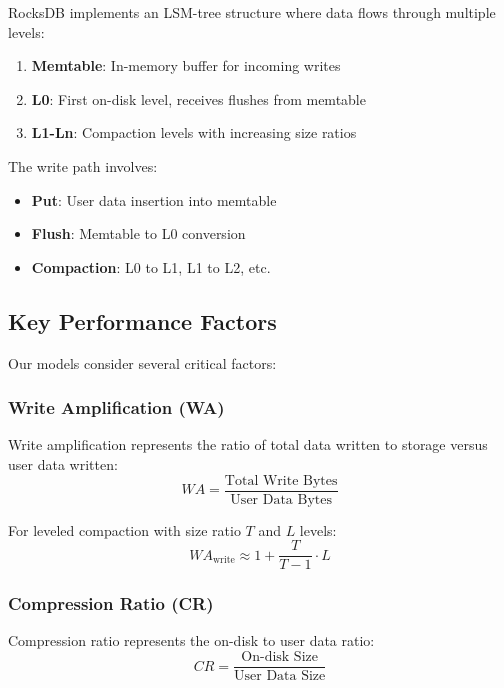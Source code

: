 \documentclass[11pt,twocolumn]{article}
\begin{document}
RocksDB implements an LSM-tree structure where data flows through multiple levels:
\begin{enumerate}
    \item \textbf{Memtable}: In-memory buffer for incoming writes
    \item \textbf{L0}: First on-disk level, receives flushes from memtable
    \item \textbf{L1-Ln}: Compaction levels with increasing size ratios
\end{enumerate}

The write path involves:
\begin{itemize}
    \item \textbf{Put}: User data insertion into memtable
    \item \textbf{Flush}: Memtable to L0 conversion
    \item \textbf{Compaction}: L0 to L1, L1 to L2, etc.
\end{itemize}

\subsection{Key Performance Factors}

Our models consider several critical factors:

\subsubsection{Write Amplification (WA)}
Write amplification represents the ratio of total data written to storage versus user data written:
\begin{equation}
WA = \frac{\text{Total Write Bytes}}{\text{User Data Bytes}}
\end{equation}

For leveled compaction with size ratio $T$ and $L$ levels:
\begin{equation}
WA_{\text{write}} \approx 1 + \frac{T}{T-1} \cdot L
\end{equation}

\subsubsection{Compression Ratio (CR)}
Compression ratio represents the on-disk to user data ratio:
\begin{equation}
CR = \frac{\text{On-disk Size}}{\text{User Data Size}}
\end{equation}
\end{document}
